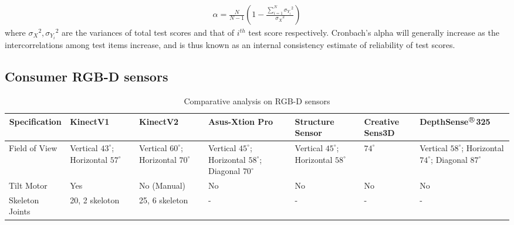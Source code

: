 \begin{enumerate}[leftmargin={0.5cm},topsep={0pt},itemsep={0pt},partopsep={0pt},parsep={0pt}]
\begin{align*}
\alpha = \frac{N}{N-1} \left( 1 - \frac{\sum_{i=1}^{N} {\sigma_{Y_i}}^2}{{\sigma_{X}}^2} \right)
\end{align*}
where ${\sigma_X}^2,{\sigma_{Y_i}}^2$ are the variances of total test scores and that of $i^{th}$ test score respectively. Cronbach's alpha will generally increase as the intercorrelations among test items increase, and is thus known as an internal consistency estimate of reliability of test scores.
\end{enumerate}

\clearpage
\begin{landscape}
\small
\section{Consumer RGB-D sensors} %
\label{appendix:rgbd_sensors}
\centering
\begin{table}[H]
\scriptsize
\caption{Comparative analysis on RGB-D sensors}
\label{table:rgbd_sensors}
\begin{tabularx}{600pt}{c*6{X}}
\toprule
  \textbf{Specification} & \textbf{KinectV1\footnotemark[1]} 
                         & \textbf{KinectV2\footnotemark[1]} 
                         & \textbf{Asus-Xtion Pro\footnotemark[2]} 
                         & \textbf{Structure Sensor\footnotemark[3]}
                         & \textbf{Creative Sens3D\footnotemark[4]} 
                         &  \textbf{DepthSense$^{\regmark}$325\footnotemark[5]} 
  \tabularnewline \midrule
  \multicolumn{1}{l}{Field of View}       & Vertical $43^{\circ}$; Horizontal $57^{\circ}$  
                                          & Vertical $60^{\circ}$; Horizontal $70^{\circ}$ 
                                          & Vertical $45^{\circ}$; Horizontal $58^{\circ}$; Diagonal $70^{\circ}$
                                          & Vertical $45^{\circ}$; Horizontal $58^{\circ}$ 
                                          & $74^{\circ}$
                                          & Vertical $58^{\circ}$; Horizontal $74^{\circ}$; Diagonal $87^{\circ}$
                                          \tabularnewline\midrule
                                          
  \multicolumn{1}{l}{Tilt Motor}          & Yes
  										 & No (Manual)
  										 & No 
  										 & No 
  										 & No
  										 & No 
  										 \tabularnewline\midrule
  \multicolumn{1}{l}{Skeleton Joints}     & 20, 2 skeloton
  										 & 25, 6 skeleton
  										 & - 
  										 & - 
  										 & - 
  										 & - 
  										 \tabularnewline\midrule			
  		 

\end{tabularx}
\end{table}
\end{landscape}
